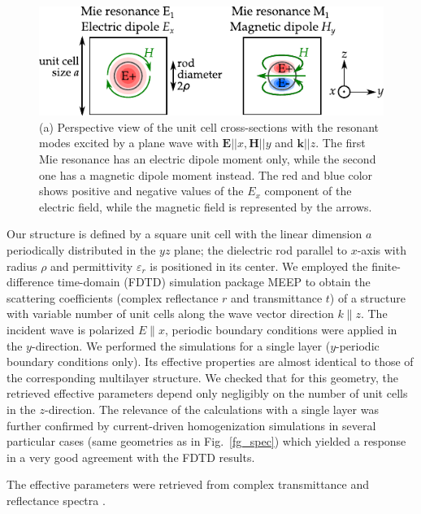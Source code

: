 \begin{figure} \centering \includegraphics[width=14cm]{img/ERods_1st_and_2nd_Mie_resonance.pdf}%
\caption{(a) Perspective view of the unit cell cross-sections with the resonant modes excited by a plane wave with $\mathbf{E}||x, \mathbf{H}||y$ and $\mathbf{k}||z$. The first Mie resonance has an electric dipole moment only, while the second one has a magnetic dipole moment instead. The red and blue color shows positive and negative values of the $E_x$ component of the electric field, while the magnetic field is represented by the arrows. } \label{fg_sketchfield} \end{figure}

Our structure  is defined by a square unit cell with the linear dimension $a$ periodically distributed in the $yz$ plane; the dielectric rod parallel to $x$-axis with radius $\rho$ and permittivity $\varepsilon_r$ is positioned in its center. We employed the finite-difference time-domain (FDTD) simulation package MEEP \cite{oskooi2010meep} to obtain the scattering coefficients (complex reflectance $r$ and transmittance $t$) of a structure with variable number of unit cells along the wave vector direction $k\parallel z$. The incident wave is polarized $E\parallel x$, periodic boundary conditions were applied in the $y$-direction. We performed the simulations for a single layer ($y$-periodic boundary conditions only). Its effective properties are almost identical to those of the corresponding multilayer structure. We checked that for this geometry, the retrieved effective parameters depend only negligibly on the number of unit cells in the $z$-direction. The relevance of the calculations with a single layer was further confirmed by current-driven homogenization simulations \cite{markel2013current} in several particular cases (same geometries as in Fig.~\ref{fg_spec}) which yielded a response in a very good agreement with the FDTD results.

The effective parameters were  retrieved from complex transmittance and reflectance spectra \cite{smith2002determination}.   

